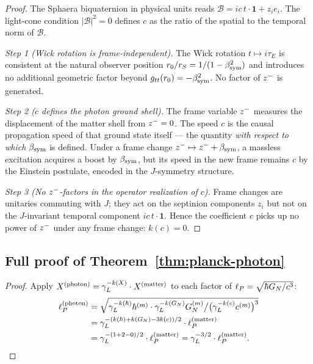 \begin{proof}
The Sphaera biquaternion in physical units reads
$\mathcal{B} = ic\,t\cdot\mathbf{1}+z_i e_i$.
The light-cone condition $|\mathcal{B}|^2=0$ defines $c$ as the ratio
of the spatial to the temporal norm of $\mathcal{B}$.

\emph{Step 1 (Wick rotation is frame-independent).}
The Wick rotation $t\mapsto i\tau_E$ is consistent at the natural
observer position $r_0/r_S=1/(1-\beta_{\mathrm{sym}}^2)$ and introduces no additional
geometric factor beyond $g_{tt}(r_0)=-\beta_{\mathrm{sym}}^2$.
No factor of $z^-$ is generated.

\emph{Step 2 ($c$ defines the photon ground shell).}
The frame variable $z^-$ measures the displacement of the matter
shell from $z^-=0$.
The speed $c$ is the causal propagation speed of that ground state
itself --- the quantity \emph{with respect to which} $\beta_{\mathrm{sym}}$ is defined.
Under a frame change $z^-\mapsto z^-+\beta_{\mathrm{sym}}$, a massless excitation
acquires a boost by $\beta_{\mathrm{sym}}$, but its speed in the new frame remains $c$
by the Einstein postulate, encoded in the $J$-symmetry structure.

\emph{Step 3 (No $z^-$-factors in the operator realization of $c$).}
Frame changes are unitaries commuting with $J$; they act on the septinion
components $z_i$ but not on the $J$-invariant temporal component
$ic\,t\cdot\mathbf{1}$.
Hence the coefficient $c$ picks up no power of $z^-$ under any
frame change: $k(c)=0$.
\end{proof}

\subsection{Full proof of Theorem~\ref{thm:planck-photon}}
\label{app:planck-reintegrated}

\begin{proof}
Apply $X^{(\mathrm{photon})}=\gamma_L^{-k(X)}\cdot X^{(\mathrm{matter})}$
to each factor of $\ell_P=\sqrt{\hbar G_N/c^3}$:
\begin{align*}
  \ell_P^{(\mathrm{photon})}
  &= \sqrt{
       \gamma_L^{-k(\hbar)}\hbar^{(m)}
       \cdot\gamma_L^{-k(G_N)}G_N^{(m)}
       \big/
       \bigl(\gamma_L^{-k(c)}c^{(m)}\bigr)^3
     }\\
  &= \gamma_L^{-(k(\hbar)+k(G_N)-3k(c))/2}
     \cdot\ell_P^{(\mathrm{matter})}\\
  &= \gamma_L^{-(1+2-0)/2}\cdot\ell_P^{(\mathrm{matter})}
   = \gamma_L^{-3/2}\cdot\ell_P^{(\mathrm{matter})}.\qedhere
\end{align*}
\end{proof}

